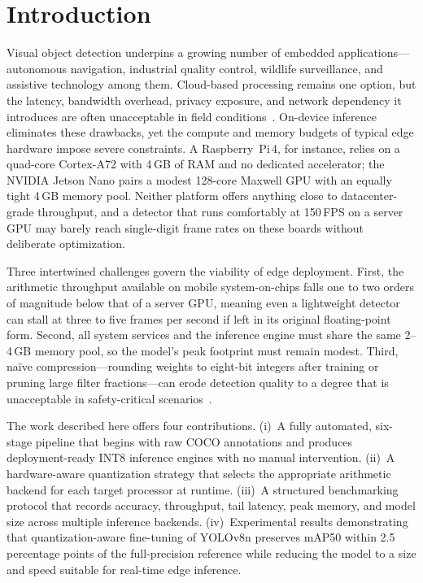 \documentclass[conference]{IEEEtran}
\begin{document}

\section{Introduction}

Visual object detection underpins a growing number of embedded applications---autonomous navigation, industrial quality control, wildlife surveillance, and assistive technology among them. Cloud-based processing remains one option, but the latency, bandwidth overhead, privacy exposure, and network dependency it introduces are often unacceptable in field conditions~\cite{b1}. On-device inference eliminates these drawbacks, yet the compute and memory budgets of typical edge hardware impose severe constraints. A Raspberry~Pi\,4, for instance, relies on a quad-core Cortex-A72 with 4\,GB of RAM and no dedicated accelerator; the NVIDIA Jetson Nano pairs a modest 128-core Maxwell GPU with an equally tight 4\,GB memory pool. Neither platform offers anything close to datacenter-grade throughput, and a detector that runs comfortably at 150\,FPS on a server GPU may barely reach single-digit frame rates on these boards without deliberate optimization.

Three intertwined challenges govern the viability of edge deployment. First, the arithmetic throughput available on mobile system-on-chips falls one to two orders of magnitude below that of a server GPU, meaning even a lightweight detector can stall at three to five frames per second if left in its original floating-point form. Second, all system services and the inference engine must share the same 2--4\,GB memory pool, so the model's peak footprint must remain modest. Third, na\"ive compression---rounding weights to eight-bit integers after training or pruning large filter fractions---can erode detection quality to a degree that is unacceptable in safety-critical scenarios~\cite{b10}.

The work described here offers four contributions. (i)~A fully automated, six-stage pipeline that begins with raw COCO annotations and produces deployment-ready INT8 inference engines with no manual intervention. (ii)~A hardware-aware quantization strategy that selects the appropriate arithmetic backend for each target processor at runtime. (iii)~A structured benchmarking protocol that records accuracy, throughput, tail latency, peak memory, and model size across multiple inference backends. (iv)~Experimental results demonstrating that quantization-aware fine-tuning of YOLOv8n preserves mAP50 within 2.5 percentage points of the full-precision reference while reducing the model to a size and speed suitable for real-time edge inference.
\end{document}
